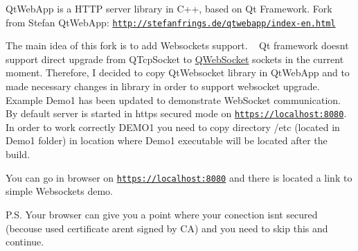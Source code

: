 Qt\+Web\+App is a H\+T\+TP server library in C++, based on Qt Framework. Fork from Stefan Qt\+Web\+App\+: \href{http://stefanfrings.de/qtwebapp/index-en.html}{\tt http\+://stefanfrings.\+de/qtwebapp/index-\/en.\+html}

The main idea of this fork is to add Websockets support. ~\newline
Qt framework doesn\textquotesingle{}t support direct upgrade from Q\+Tcp\+Socket to \mbox{\hyperlink{class_q_web_socket}{Q\+Web\+Socket}} sockets in the current moment. Therefore, I decided to copy Qt\+Websocket library in Qt\+Web\+App and to made necessary changes in library in order to support websocket upgrade. Example Demo1 has been updated to demonstrate Web\+Socket communication. By default server is started in https secured mode on \href{https://localhost:8080}{\tt https\+://localhost\+:8080}. In order to work correctly D\+E\+M\+O1 you need to copy directory /etc (located in Demo1 folder) in location where Demo1 executable will be located after the build.

You can go in browser on \href{https://localhost:8080}{\tt https\+://localhost\+:8080} and there is located a link to simple Websockets demo.

P.\+S. Your browser can give you a point where your conection isn\textquotesingle{}t secured (becouse used certificate aren\textquotesingle{}t signed by CA) and you need to skip this and continue. 